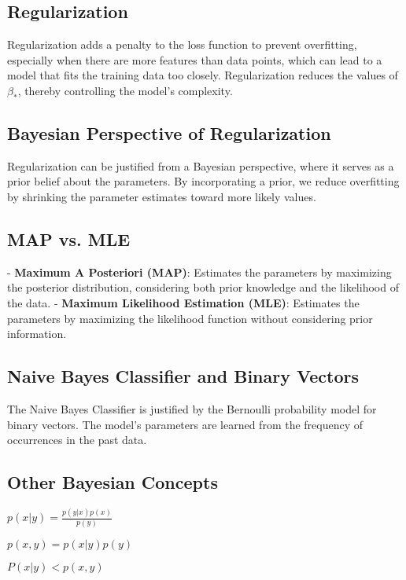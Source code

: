 \documentclass[10pt]{article}
\begin{document}
\begin{multicols}{2}
\subsection*{Regularization}
Regularization adds a penalty to the loss function to prevent overfitting, especially when there are more features than data points, which can lead to a model that fits the training data too closely. Regularization reduces the values of \( \beta_* \), thereby controlling the model's complexity.

\subsection*{Bayesian Perspective of Regularization}
Regularization can be justified from a Bayesian perspective, where it serves as a prior belief about the parameters. By incorporating a prior, we reduce overfitting by shrinking the parameter estimates toward more likely values.

\subsection*{MAP vs. MLE}
- \textbf{Maximum A Posteriori (MAP)}: Estimates the parameters by maximizing the posterior distribution, considering both prior knowledge and the likelihood of the data.
- \textbf{Maximum Likelihood Estimation (MLE)}: Estimates the parameters by maximizing the likelihood function without considering prior information.

\subsection*{Naive Bayes Classifier and Binary Vectors}
The Naive Bayes Classifier is justified by the Bernoulli probability model for binary vectors. The model's parameters are learned from the frequency of occurrences in the past data.
\subsection*{Other Bayesian Concepts}
$p(x|y) = \frac{p(y|x)p(x)}{p(y)}$

$p(x,y) = p(x|y)p(y)$

$P(x|y) < p(x,y)$
\end{multicols}
\end{document}
